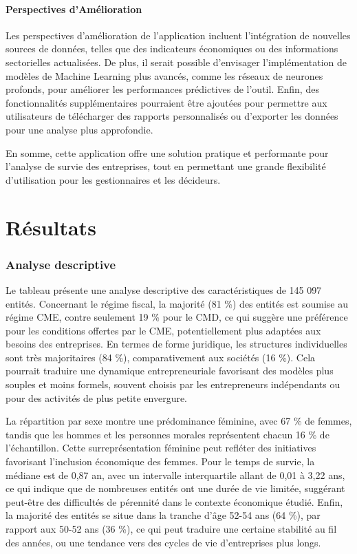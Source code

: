 \documentclass[a4paper,12pt]{report}
\begin{document}
\subsubsection{Perspectives d'Amélioration}

Les perspectives d’amélioration de l’application incluent l’intégration de nouvelles sources de données, telles que des indicateurs économiques ou des informations sectorielles actualisées. De plus, il serait possible d’envisager l’implémentation de modèles de Machine Learning plus avancés, comme les réseaux de neurones profonds, pour améliorer les performances prédictives de l’outil. Enfin, des fonctionnalités supplémentaires pourraient être ajoutées pour permettre aux utilisateurs de télécharger des rapports personnalisés ou d’exporter les données pour une analyse plus approfondie.

En somme, cette application offre une solution pratique et performante pour l’analyse de survie des entreprises, tout en permettant une grande flexibilité d’utilisation pour les gestionnaires et les décideurs.


\newpage
\chapter{Résultats}
\subsection{Analyse descriptive}




\noindent
Le tableau présente une analyse descriptive des caractéristiques de 145 097 entités. Concernant le régime fiscal, la majorité (81 \%) des entités est soumise au régime CME, contre seulement 19 \% pour le CMD, ce qui suggère une préférence pour les conditions offertes par le CME, potentiellement plus adaptées aux besoins des entreprises. En termes de forme juridique, les structures individuelles sont très majoritaires (84 \%), comparativement aux sociétés (16 \%). Cela pourrait traduire une dynamique entrepreneuriale favorisant des modèles plus souples et moins formels, souvent choisis par les entrepreneurs indépendants ou pour des activités de plus petite envergure.

La répartition par sexe montre une prédominance féminine, avec 67 \% de femmes, tandis que les hommes et les personnes morales représentent chacun 16 \% de l’échantillon. Cette surreprésentation féminine peut refléter des initiatives favorisant l’inclusion économique des femmes. Pour le temps de survie, la médiane est de 0,87 an, avec un intervalle interquartile allant de 0,01 à 3,22 ans, ce qui indique que de nombreuses entités ont une durée de vie limitée, suggérant peut-être des difficultés de pérennité dans le contexte économique étudié. Enfin, la majorité des entités se situe dans la tranche d’âge 52-54 ans (64 \%), par rapport aux 50-52 ans (36 \%), ce qui peut traduire une certaine stabilité au fil des années, ou une tendance vers des cycles de vie d’entreprises plus longs.
\end{document}
